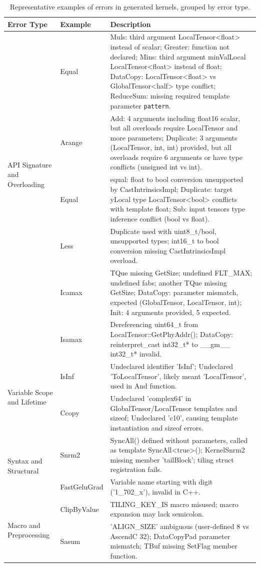 \begin{table}[t]
\centering
\caption{Representative examples of errors in generated kernels, grouped by error type.}
\label{tab:kernel_errors_full}
\begin{tabular}{p{5cm} p{2cm} p{8cm}}
\toprule
\textbf{Error Type} & \textbf{Example} & \textbf{Description} \\
\midrule
\multirow{5}{*}{API Signature and Overloading} 
& Equal & Muls: third argument LocalTensor<float> instead of scalar; Greater: function not declared; Mins: third argument minValLocal LocalTensor<float> instead of float; DataCopy: LocalTensor<float> vs GlobalTensor<half> type conflict; ReduceSum: missing required template parameter \texttt{pattern}. \\
& Arange & Add: 4 arguments including float16 scalar, but all overloads require LocalTensor and more parameters; Duplicate: 3 arguments (LocalTensor, int, int) provided, but all overloads require 6 arguments or have type conflicts (unsigned int vs int). \\
\midrule
\multirow{2}{*}{Data Type and Casting} 
& Equal & equal: float to bool conversion unsupported by CastIntrinsicsImpl; Duplicate: target yLocal type LocalTensor<bool> conflicts with template float; Sub: input tensors type inference conflict (bool vs float). \\
& Less & Duplicate used with uint8\_t/bool, unsupported types; int16\_t to bool conversion missing CastIntrinsicsImpl overload. \\
\midrule
\multirow{2}{*}{Memory and Object Misuse} 
& Icamax & TQue missing GetSize; undefined FLT\_MAX; undefined fabs; another TQue missing GetSize; DataCopy: parameter mismatch, expected (GlobalTensor, LocalTensor, int); Init: 4 arguments provided, 5 expected. \\
& Isamax & Dereferencing uint64\_t from LocalTensor::GetPhyAddr(); DataCopy: reinterpret\_cast int32\_t* to \_\_gm\_\_ int32\_t* invalid. \\
\midrule
\multirow{2}{*}{Variable Scope and Lifetime} 
& IsInf & Undeclared identifier 'IsInf'; Undeclared 'ToLocalTensor', likely meant 'LocalTensor', used in And function. \\
& Ccopy & Undeclared 'complex64' in GlobalTensor/LocalTensor templates and sizeof; Undeclared 'c10', causing template instantiation and sizeof errors. \\
\midrule
\multirow{2}{*}{Syntax and Structural} 
& Snrm2 & SyncAll() defined without parameters, called as template SyncAll<true>(); KernelSnrm2 missing member 'tailBlock'; tiling struct registration fails. \\
& FastGeluGrad & Variable name starting with digit ('1\_702\_x'), invalid in C++. \\
\midrule
\multirow{2}{*}{Macro and Preprocessing} 
& ClipByValue & TILING\_KEY\_IS macro misused; macro expansion may lack semicolon. \\
& Sasum & 'ALIGN\_SIZE' ambiguous (user-defined 8 vs AscendC 32); DataCopyPad parameter mismatch; TBuf missing SetFlag member function. \\
\bottomrule
\end{tabular}
\label{tab:error_examples}
\end{table}

